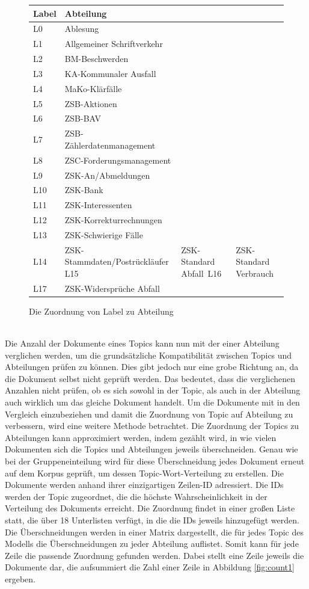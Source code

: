 \documentclass[german,version-2020-11]{uzl-thesis}
\begin{document}
\begin{itemize}
\begin{enumerate}
\begin{figure}[h]
\begin{center}
\begin{tabular}{ll}
\hline
\hline
Label&Abteilung\\
\hline
L0&Ablesung\\
L1&Allgemeiner Schriftverkehr\\
L2&BM-Beschwerden\\
L3&KA-Kommunaler Ausfall\\
L4&MaKo-Klärfälle\\
L5&ZSB-Aktionen\\
L6&ZSB-BAV\\
L7&ZSB-Zählerdatenmanagement\\
L8&ZSC-Forderungsmanagement\\
L9&ZSK-An/Abmeldungen\\
L10&ZSK-Bank\\
L11&ZSK-Interessenten\\
L12&ZSK-Korrekturrechnungen\\
L13&ZSK-Schwierige Fälle\\
L14&ZSK-Stammdaten/Postrückläufer
L15&ZSK-Standard Abfall\
L16&ZSK-Standard Verbrauch\\
L17&ZSK-Widersprüche Abfall\\
\hline
\hline
\end{tabular}
\caption{Die Zuordnung von Label zu Abteilung}
\label{fig:labels}
\end{center}
\end{figure}\\


Die Anzahl der Dokumente eines Topics kann nun mit der einer Abteilung verglichen werden, um die grundsätzliche Kompatibilität zwischen Topics und Abteilungen prüfen zu können. Dies gibt jedoch nur eine grobe Richtung an, da die Dokument selbst nicht geprüft werden. Das bedeutet, dass die verglichenen Anzahlen nicht prüfen, ob es sich sowohl in der Topic, als auch in der Abteilung auch wirklich um das gleiche Dokument handelt. Um die Dokumente mit in den Vergleich einzubeziehen und damit die Zuordnung von Topic auf Abteilung zu verbessern, wird eine weitere Methode betrachtet. Die Zuordnung der Topics zu Abteilungen kann approximiert werden, indem gezählt wird, in wie vielen Dokumenten sich die Topics und Abteilungen jeweils überschneiden. Genau wie bei der Gruppeneinteilung wird für diese Überschneidung jedes Dokument erneut auf dem Korpus geprüft, um dessen Topic-Wort-Verteilung zu erstellen. Die Dokumente werden anhand ihrer einzigartigen Zeilen-ID adressiert. Die IDs werden der Topic zugeordnet, die die höchste Wahrscheinlichkeit in der Verteilung des Dokuments erreicht. Die Zuordnung findet in einer großen Liste statt, die über 18 Unterlisten verfügt, in die die IDs jeweils hinzugefügt werden. Die Überschneidungen werden in einer Matrix dargestellt, die für jedes Topic des Modells die Überschneidungen zu jeder Abteilung auflistet. Somit kann für jede Zeile die passende Zuordnung gefunden werden. Dabei stellt eine Zeile jeweils die Dokumente dar, die aufsummiert die Zahl einer Zeile in Abbildung \ref{fig:count1} ergeben. 


\end{enumerate}
\end{itemize}
\end{document}
